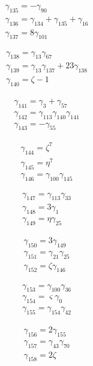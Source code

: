 \[\begin{aligned}\gamma_{135}=- \gamma_{90}\\ \gamma_{136}=\gamma_{134} + \gamma_{135} + \gamma_{16}\\ \gamma_{137}=8 \gamma_{101}\end{aligned}\]

\[\begin{aligned}\gamma_{138}=\gamma_{13} \gamma_{67}\\ \gamma_{139}=\gamma_{13} \gamma_{137} + 23 \gamma_{138}\\ \gamma_{140}=\zeta  - 1\end{aligned}\]

\[\begin{aligned}\gamma_{141}=\gamma_{3} + \gamma_{57}\\ \gamma_{142}=\gamma_{113} \gamma_{140} \gamma_{141}\\ \gamma_{143}=- \gamma_{55}\end{aligned}\]

\[\begin{aligned}\gamma_{144}=\zeta ^{7}\\ \gamma_{145}=\eta ^{7}\\ \gamma_{146}=\gamma_{100} \gamma_{145}\end{aligned}\]

\[\begin{aligned}\gamma_{147}=\gamma_{113} \gamma_{33}\\ \gamma_{148}=3 \gamma_{1}\\ \gamma_{149}=\eta  \gamma_{25}\end{aligned}\]

\[\begin{aligned}\gamma_{150}=3 \gamma_{149}\\ \gamma_{151}=\gamma_{21} \gamma_{25}\\ \gamma_{152}=\zeta  \gamma_{146}\end{aligned}\]

\[\begin{aligned}\gamma_{153}=\gamma_{100} \gamma_{36}\\ \gamma_{154}=\varsigma  \gamma_{0}\\ \gamma_{155}=\gamma_{154} \gamma_{42}\end{aligned}\]

\[\begin{aligned}\gamma_{156}=2 \gamma_{155}\\ \gamma_{157}=\gamma_{43} \gamma_{70}\\ \gamma_{158}=2 \zeta \end{aligned}\]

